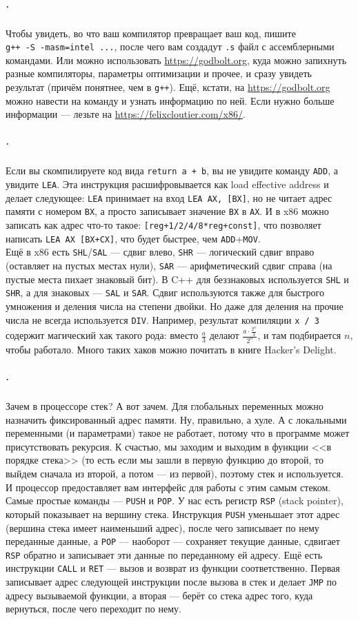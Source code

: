 \documentclass{article}
\newcommand{\asm}[1]{\texttt{#1}}
\begin{document}
    \subparagraph{.}
    Чтобы увидеть, во что ваш компилятор превращает ваш код, пишите\\
    \texttt{g++ -S -masm=intel ...}, после чего вам создадут \texttt{.s} файл с ассемблерными командами. Или можно использовать \url{https://godbolt.org}, куда можно запихнуть разные компиляторы, параметры оптимизации и прочее, и сразу увидеть результат (причём понятнее, чем в \texttt{g++}). Ещё, кстати, на \url{https://godbolt.org} можно навести на команду и узнать информацию по ней. Если нужно больше информации --- лезьте на \url{https://felixcloutier.com/x86/}.
    \subparagraph{.}
    Если вы скомпилируете код вида \texttt{return a + b}, вы не увидите команду \asm{ADD}, а увидите \asm{LEA}. Эта инструкция расшифровывается как load effective address и делает следующее: \asm{LEA} принимает на вход \asm{LEA AX, [BX]}, но не читает адрес памяти с номером \asm{BX}, а просто записывает значение \asm{BX} в \asm{AX}. И в x86 можно записать как адрес что-то такое: \asm{[reg+1/2/4/8*reg+const]}, что позволяет написать \asm{LEA AX [BX+CX]}, что будет быстрее, чем \asm{ADD}+\asm{MOV}.\\
    Ещё в x86 есть \asm{SHL}/\asm{SAL} --- сдвиг влево, \asm{SHR} --- логический сдвиг вправо (оставляет на пустых местах нули), \asm{SAR} --- арифметический сдвиг справа (на пустые места пихает знаковый бит). В C++ для беззнаковых используется \asm{SHL} и \asm{SHR}, а для знаковых --- \asm{SAL} и \asm{SAR}. Сдвиг используются также для быстрого умножения  и деления числа на степени двойки. Но даже для деления на прочие числа не всегда используется \asm{DIV}. Например, результат компиляции \texttt{x / 3} содержит магический хак такого рода: вместо $\frac a3$ делают $\frac{a\cdot\frac{2^n}3}{2^n}$, и там подбирается $n$, чтобы работало. Много таких хаков можно почитать в книге Hacker's Delight.
    \subparagraph{.}
    Зачем в процессоре стек? А вот зачем. Для глобальных переменных можно назначить фиксированный адрес памяти. Ну, правильно, а хуле. А с локальными переменными (и параметрами) такое не работает, потому что в программе может присутствовать рекурсия. К счастью, мы заходим и выходим в функции <<в порядке стека>> (то есть если мы зашли в первую функцию до второй, то выйдем сначала из второй, а потом --- из первой), поэтому стек и используется. И процессор предоставляет вам интерфейс для работы с этим самым стеком. Самые простые команды --- \asm{PUSH} и \asm{POP}. У нас есть регистр \asm{RSP} (stack pointer), который показывает на вершину стека. Инструкция \asm{PUSH} уменьшает этот адрес (вершина стека имеет наименьший адрес), после чего записывает по нему переданные данные, а \asm{POP} --- наоборот --- сохраняет текущие данные, сдвигает \asm{RSP} обратно и записывает эти данные по переданному ей адресу. Ещё есть инструкции \asm{CALL} и \asm{RET} --- вызов и возврат из функции соответственно. Первая записывает адрес следующей инструкции после вызова в стек и делает \asm{JMP} по адресу вызываемой функции, а вторая --- берёт со стека адрес того, куда вернуться, после чего переходит по нему.\\
\end{document}
